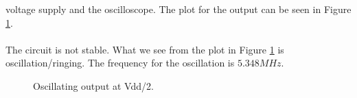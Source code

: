 \documentclass[a4paper,english,11pt]{article}
\begin{document}
voltage supply and the oscilloscope. The plot for the output can be seen in Figure \ref{fig:oscil:out}.\\
\\
The circuit is not stable. What we see from the plot in Figure \ref{fig:oscil:out} is oscillation/ringing. The frequency for the oscillation is
$5.348 MHz$.
\begin{figure}[!htbp]
 \centering
  \caption{Oscillating output at Vdd/2.}
  \label{fig:oscil:out}	
\end{figure}
\end{document}
